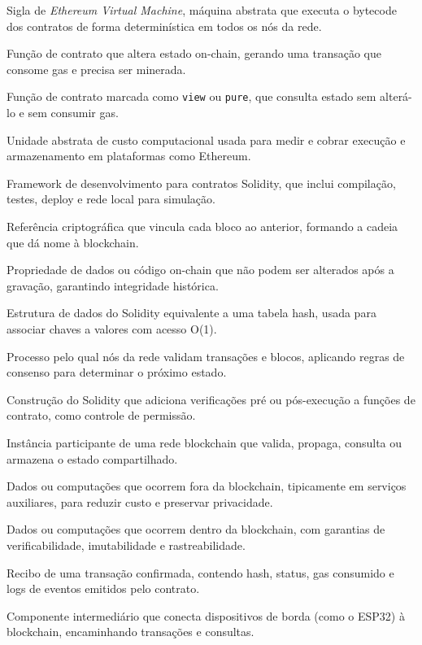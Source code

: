\begin{description}[
  font=\normalfont\bfseries,
  style=multiline,
  leftmargin=5.6cm,
  labelwidth=4.9cm,
  labelsep=0.35cm,
  itemsep=0.55\baselineskip
]
  \item[EVM] Sigla de \textit{Ethereum Virtual Machine}, máquina abstrata que executa o bytecode dos contratos de forma determinística em todos os nós da rede.
  \item[Função de escrita] Função de contrato que altera estado on-chain, gerando uma transação que consome gas e precisa ser minerada.
  \item[Função de leitura] Função de contrato marcada como \texttt{view} ou \texttt{pure}, que consulta estado sem alterá-lo e sem consumir gas.
  \item[Gas] Unidade abstrata de custo computacional usada para medir e cobrar execução e armazenamento em plataformas como Ethereum.
  \item[Hardhat] Framework de desenvolvimento para contratos Solidity, que inclui compilação, testes, deploy e rede local para simulação.
  \item[Hash do bloco] Referência criptográfica que vincula cada bloco ao anterior, formando a cadeia que dá nome à blockchain.
  \item[Imutabilidade] Propriedade de dados ou código on-chain que não podem ser alterados após a gravação, garantindo integridade histórica.
  \item[Mapping] Estrutura de dados do Solidity equivalente a uma tabela hash, usada para associar chaves a valores com acesso O(1).
  \item[Mineração] Processo pelo qual nós da rede validam transações e blocos, aplicando regras de consenso para determinar o próximo estado.
  \item[Modifier] Construção do Solidity que adiciona verificações pré ou pós-execução a funções de contrato, como controle de permissão.
  \item[Nó] Instância participante de uma rede blockchain que valida, propaga, consulta ou armazena o estado compartilhado.
  \item[Off-chain] Dados ou computações que ocorrem fora da blockchain, tipicamente em serviços auxiliares, para reduzir custo e preservar privacidade.
  \item[On-chain] Dados ou computações que ocorrem dentro da blockchain, com garantias de verificabilidade, imutabilidade e rastreabilidade.
  \item[Receipt] Recibo de uma transação confirmada, contendo hash, status, gas consumido e logs de eventos emitidos pelo contrato.
  \item[Relayer] Componente intermediário que conecta dispositivos de borda (como o ESP32) à blockchain, encaminhando transações e consultas.

\end{description}
